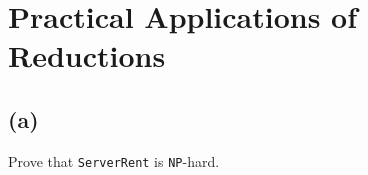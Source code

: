 



\section{Practical Applications of Reductions}

\subsection{(a)}

Prove that \texttt{ServerRent} is \texttt{NP}-hard.


